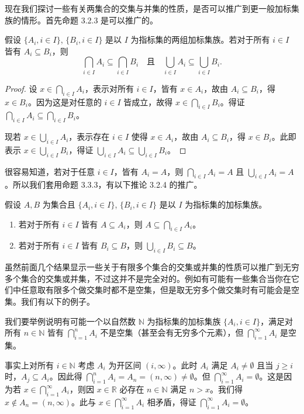 现在我们探讨一些有关两集合的交集与并集的性质，是否可以推广到更一般加标集族的情形。首先命题 3.2.3 是可以推广的。

\begin{proposition}
假设 $\{A_i, i \in I\}$, $\{B_i, i \in I\}$ 是以 $I$ 为指标集的两组加标集族。若对于所有 $i \in I$ 皆有 $A_i \subseteq B_i$，则
$$ \bigcap_{i \in I} A_i \subseteq \bigcap_{i \in I} B_i \quad \text{且} \quad \bigcup_{i \in I} A_i \subseteq \bigcup_{i \in I} B_i. $$
\end{proposition}

\begin{proof}
设 $x \in \bigcap_{i \in I} A_i$，表示对所有 $i \in I$，皆有 $x \in A_i$，故由 $A_i \subseteq B_i$，得 $x \in B_i$。因为这是对任意的 $i \in I$ 皆成立，故得 $x \in \bigcap_{i \in I} B_i$。得证 $\bigcap_{i \in I} A_i \subseteq \bigcap_{i \in I} B_i$。

现若 $x \in \bigcup_{i \in I} A_i$，表示存在 $i \in I$ 使得 $x \in A_i$，故由 $A_i \subseteq B_i$，得 $x \in B_i$。此即表示 $x \in \bigcup_{i \in I} B_i$，得证 $\bigcup_{i \in I} A_i \subseteq \bigcup_{i \in I} B_i$。
\end{proof}

很容易知道，若对于任意 $i \in I$，皆有 $A_i = A$，则 $\bigcap_{i \in I} A_i = A$ 且 $\bigcup_{i \in I} A_i = A$。所以我们套用命题 3.3.3，有以下推论 3.2.4 的推广。

\begin{corollary}
假设 $A, B$ 为集合且 $\{A_i, i \in I\}$, $\{B_i, i \in I\}$ 是以 $I$ 为指标集的加标集族。
\begin{enumerate}
  \item 若对于所有 $i \in I$ 皆有 $A \subseteq A_i$，则 $A \subseteq \bigcap_{i \in I} A_i$。
  \item 若对于所有 $i \in I$ 皆有 $B_i \subseteq B$，则 $\bigcup_{i \in I} B_i \subseteq B$。
\end{enumerate}
\end{corollary}

虽然前面几个结果显示一些关于有限多个集合的交集或并集的性质可以推广到无穷多个集合的交集或并集，不过这并不是完全对的。例如有可能有一些集合当你在它们中任意取有限多个做交集时都不是空集，但是取无穷多个做交集时有可能会是空集。我们有以下的例子。

\begin{example}
我们要举例说明有可能一个以自然数 $\mathbb{N}$ 为指标集的加标集族 $\{A_i, i \in I\}$，满足对所有 $n \in \mathbb{N}$ 皆有 $\bigcap_{i=1}^{n} A_i$ 不是空集（甚至会有无穷多个元素），但 $\bigcap_{i=1}^{\infty} A_i$ 是空集。

事实上对所有 $i \in \mathbb{N}$ 考虑 $A_i$ 为开区间 $(i, \infty)$。此时 $A_i$ 满足 $A_i \neq \emptyset$ 且当 $j \geq i$ 时，$A_j \subseteq A_i$。因此得 $\bigcap_{i=1}^{n} A_i = A_n = (n, \infty) \neq \emptyset$。但 $\bigcap_{i=1}^{\infty} A_i = \emptyset$。这是因为若 $x \in \bigcap_{i=1}^{\infty} A_i$，则因 $x \in \mathbb{R}$ 必存在 $n \in \mathbb{N}$ 满足 $n > x$。我们得 $x \notin A_n = (n, \infty)$。此与 $x \in \bigcap_{i=1}^{\infty} A_i$ 相矛盾，得证 $\bigcap_{i=1}^{\infty} A_i = \emptyset$。
\end{example}


